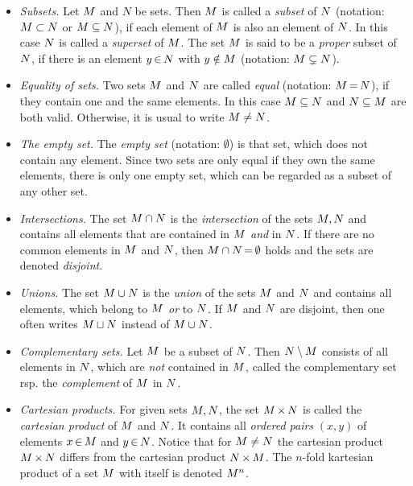 \documentclass[11pt,twoside]{article}
\begin{document}
\begin{itemize}[leftmargin=5mm]
\item[a.] \textit{Subsets.}
Let $M$ and $N$ be sets.
Then $M$ is called a \textit{subset} of $N$
(notation: $M \subset N$ or $M \subseteq N$),
if each element of $M$ is also an element of $N$.
In this case $N$ is called a \textit{superset} of $M$.
The set $M$ is said to be a \textit{proper} subset of $N$,
if there is an element $y {\,\in\,} N$ with $y \notin M$
(notation: $M \subsetneq N$).

\item[b.] \textit{Equality of sets.}
Two sets $M$ and $N$ are called \textit{equal}
(notation: $M {\,=\,} N$),
if they contain one and the same elements.
In this case $M \subseteq N$ and $N \subseteq M$ are both valid.
Otherwise,
it is usual to write $M \neq N$.

\item[c.] \textit{The empty set.}
The \textit{empty set} (notation: $\emptyset$) is that set,
which does not contain any element. 
Since two sets are only equal if they own the same elements,
there is only one empty set,
which can be regarded as a subset of any other set.

\item[d.] \textit{Intersections.}
The set $M \cap N$ is the \textit{intersection}
of the sets $M, N$ and contains all elements
that are contained in $M$ \textit{and} in $N$.
If there are no common elements in $M$ and $N$,
then $M \cap N {\,=\,} \emptyset$ holds
and the sets are denoted \textit{disjoint}.

\item[e.] \textit{Unions.}
The set $M \cup N$ is the \textit{union}
of the sets $M$ and $N$ and contains all elements,
which belong to $M$ \textit{or} to $N$.
If $M$ and $N$ are disjoint,
then one often writes $M \sqcup N$ instead of $M \cup N$.

\item[f.] \textit{Complementary sets.}
Let $M$ be a subset of $N$.
Then $N \setminus M$ consists of all elements in $N$,
which are \textit{not} contained in $M$,
called the complementary set rsp. the \textit{complement} of $M$ in $N$.

\item[g.] \textit{Cartesian products.}
For given sets $M, N$,
the set $M {\,\times\,} N$ is called the \textit{cartesian product}
of $M$ and $N$.
It contains all \textit{ordered pairs} $(x,y)$ of elements $x {\,\in\,} M$
and $y {\,\in\,} N$.
Notice
that for $M \neq N$ the cartesian product $M {\,\times\,} N$ differs
from the cartesian product $N {\,\times\,} M$.
The $n$-fold kartesian product of a set $M$ with itself is denoted $M^n$.
\end{itemize}
\end{document}
